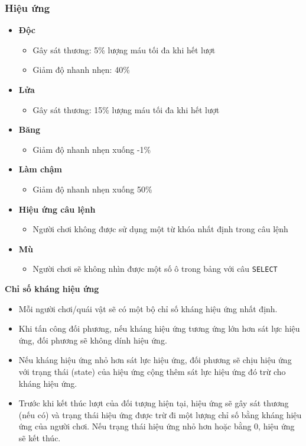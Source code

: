 \subsubsection{Hiệu ứng}
\begin{itemize}
	\item \textbf{Độc}
	\begin{itemize}
		\item Gây sát thương: 5\% lượng máu tối đa khi hết lượt
		\item Giảm độ nhanh nhẹn: 40\%
	\end{itemize}
	\item \textbf{Lửa}
	\begin{itemize}
		\item Gây sát thương: 15\% lượng máu tối đa khi hết lượt
	\end{itemize}
	\item \textbf{Băng}
	\begin{itemize}
		\item Giảm độ nhanh nhẹn xuống -1\%
	\end{itemize}
	\item \textbf{Làm chậm}
	\begin{itemize}
		\item Giảm độ nhanh nhẹn xuống 50\%
	\end{itemize}
	\item \textbf{Hiệu ứng câu lệnh}
	\begin{itemize}
		\item Người chơi không được sử dụng một từ khóa nhất định trong câu lệnh
	\end{itemize}
	\item \textbf{Mù}
	\begin{itemize}
		\item Người chơi sẽ không nhìn được một số ô trong bảng với câu \texttt{SELECT}
	\end{itemize}
\end{itemize}

\textbf{Chỉ số kháng hiệu ứng}
\begin{itemize}
	\item Mỗi người chơi/quái vật sẽ có một bộ chỉ số kháng hiệu ứng nhất định.
	\item Khi tấn công đối phương, nếu kháng hiệu ứng tương ứng lớn hơn sát lực hiệu ứng, đối phương sẽ không dính hiệu ứng.
	\item Nếu kháng hiệu ứng nhỏ hơn sát lực hiệu ứng, đối phương sẽ chịu hiệu ứng với trạng thái (state) của hiệu ứng cộng thêm sát lực hiệu ứng đó trừ cho kháng hiệu ứng.
	\item Trước khi kết thúc lượt của đối tượng hiện tại, hiệu ứng sẽ gây sát thương (nếu có) và trạng thái hiệu ứng được trừ đi một lượng chỉ số bằng kháng hiệu ứng của người chơi. Nếu trạng thái hiệu ứng nhỏ hơn hoặc bằng 0, hiệu ứng sẽ kết thúc.
\end{itemize}

